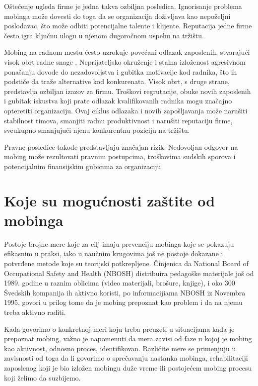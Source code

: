 \documentclass[a4paper]{article}
\begin{document}
        Oštećenje ugleda firme je jedna takva ozbiljna posledica.
        Ignorisanje problema mobinga može dovesti do toga da se organizacija doživljava kao nepoželjni poslodavac, što može odbiti potencijalne talente i klijente.
        Reputacija jedne firme često igra ključnu ulogu u njenom dugoročnom uspehu na tržištu.

        Mobing na radnom mestu često uzrokuje povećani odlazak zaposlenih, stvarajući visok obrt radne snage \cite{ELCI2014455}.
        Neprijateljsko okruženje i stalna izloženost agresivnom ponašanju dovode do nezadovoljstva i gubitka motivacije kod radnika, što ih podstiče da traže alternative kod konkurenata.
        Visok obrt, s druge strane, predstavlja ozbiljan izazov za firmu.
        Troškovi regrutacije, obuke novih zaposlenih i gubitak iskustva koji prate odlazak kvalifikovanih radnika mogu značajno opteretiti organizaciju.
        Ovaj ciklus odlazaka i novih zapošljavanja može narušiti stabilnost timova, smanjiti radnu produktivnost i narušiti reputaciju firme, sveukupno smanjujući njenu konkurentnu poziciju na tržištu.

        Pravne posledice takođe predstavljaju značajan rizik.
        Nedovoljan odgovor na mobing može rezultovati pravnim postupcima, troškovima sudskih sporova i potencijalnim finansijskim gubicima za organizaciju.
        
    \section{Koje su mogućnosti zaštite od mobinga}
    Postoje brojne mere koje za cilj imaju prevenciju mobinga koje se pokazuju efikasnim u praksi, iako u naučnim krugovima još ne postoje dokazane i potvrđene metode koje su teorijski potkrepljene. Činjenica da National Board of Occupational Safety and Health (NBOSH) distribuira pedagoške materijale još od 1989. godine u raznim oblicima (video materijali, brošure, knjige), i oko 300 Švedskih kompanija ih aktivno koristi, po informacijiama NBOSH iz Novembra 1995, govori u prilog tome da je mobing prepoznat kao problem i da na njemu treba aktivno raditi.
    
    Kada govorimo o konkretnoj meri koju treba preuzeti u situacijama kada je prepoznat mobing, važno je napomenuti da mera zavisi od faze u kojoj je mobing kao aktivnost, odnosno proces, identifikovan. Različite mere se primenjuju u zavisnosti od toga da li govorimo o sprečavanju nastanka mobinga, rehabilitaciji zaposlenog koji je bio izložen mobingu duže vreme ili postojećem mobing procesu koji želimo da suzbijemo.
    
\end{document}
